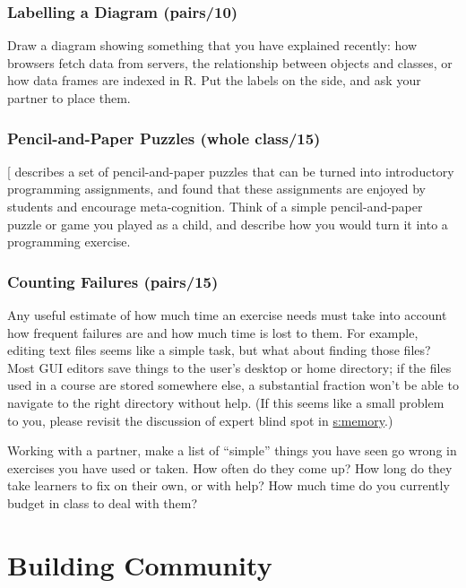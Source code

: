 \subsection{Labelling a Diagram (pairs/10)}\label{labelling-a-diagram-pairs10}

Draw a diagram showing something that you have explained recently: how
browsers fetch data from servers, the relationship between objects and
classes, or how data frames are indexed in R. Put the labels on the
side, and ask your partner to place them.

\subsection{Pencil-and-Paper Puzzles (whole class/15)}\label{pencil-and-paper-puzzles-whole-class15}

{[}\protect[\hyperlink{b:Butl2017}{Butl2017}]{]} describes a set of pencil-and-paper puzzles that can
be turned into introductory programming assignments, and found that
these assignments are enjoyed by students and encourage meta-cognition.
Think of a simple pencil-and-paper puzzle or game you played as a child,
and describe how you would turn it into a programming exercise.

\subsection{Counting Failures (pairs/15)}\label{counting-failures-pairs15}

Any useful estimate of how much time an exercise needs must take into
account how frequent failures are and how much time is lost to them. For
example, editing text files seems like a simple task, but what about
finding those files? Most GUI editors save things to the user's desktop
or home directory; if the files used in a course are stored somewhere
else, a substantial fraction won't be able to navigate to the right
directory without help. (If this seems like a small problem to you,
please revisit the discussion of expert blind spot in
\protect\hyperlink{CHAPTER}{s:memory}.)

Working with a partner, make a list of ``simple'' things you have seen go
wrong in exercises you have used or taken. How often do they come up?
How long do they take learners to fix on their own, or with help? How
much time do you currently budget in class to deal with them?

\chapter{Building Community}\label{s:community}


